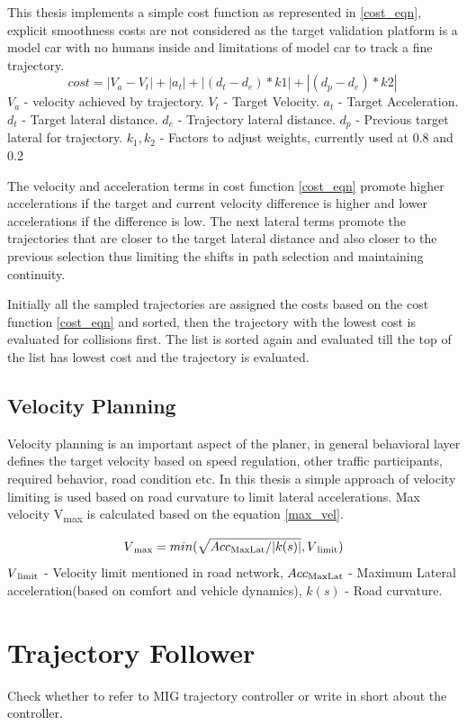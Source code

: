 This thesis implements a simple cost function as represented in \ref{cost_eqn}, explicit smoothness costs are not considered as the target validation platform is a model car with no humans inside and limitations of model car to track a fine trajectory. 
\begin{equation}
cost = |V_a - V_t| + |a_t| + | (d_t - d_e)*k1 | + | (d_p - d_e)*k2 |\
\label{cost_eqn}
\end{equation}
$V_a$ - velocity achieved by trajectory.
$V_t$ - Target Velocity.
$a_t$ - Target Acceleration.
$d_t$ - Target lateral distance.
$d_e$ - Trajectory lateral distance.
$d_p$ - Previous target lateral for trajectory.
$k_1,k_2$ - Factors to adjust weights, currently used at 0.8 and 0.2

The velocity and acceleration terms in cost function \ref{cost_eqn} promote higher accelerations if the target and current velocity difference is higher and lower accelerations if the difference is low. The next lateral terms promote the trajectories that are closer to the target lateral distance and also closer to the previous selection thus limiting the shifts in path selection and maintaining continuity. 

Initially all the sampled trajectories are assigned the costs based on the cost function \ref{cost_eqn} and sorted, then the trajectory with the lowest cost is evaluated for collisions first. The list is sorted again and evaluated till the top of the list has lowest cost and the trajectory is evaluated. 

\subsection{Velocity Planning}
Velocity planning is an important aspect of the planer, in general behavioral layer defines the target velocity based on speed regulation, other traffic participants, required behavior, road condition etc. In this thesis a simple approach of velocity limiting is used based on road curvature to limit lateral accelerations. Max velocity  V\textsubscript{max} is calculated based on the equation \ref{max_vel}. 

\begin{equation}
    V\textsubscript{max} = min(\sqrt{Acc\textsubscript{MaxLat} / |k(s)|} , V\textsubscript{limit})
\label{max_vel}
\end{equation}
$V\textsubscript{limit}$ - Velocity limit mentioned in road network,
$Acc\textsubscript{MaxLat}$ - Maximum Lateral acceleration(based on comfort and vehicle dynamics),
$k(s)$ - Road curvature.

\section{Trajectory Follower} \label{traj_follower}

Check whether to refer to MIG trajectory controller or write in short about the controller. 

